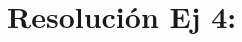 \documentclass[twocolumn,aps,prl]{revtex4-1}
\begin{document}
% 
%                             
% 

\section{Resolución Ej 4:}






\end{document}
